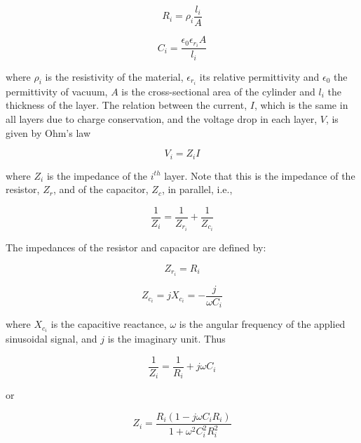 \begin{equation}
\label{eq2}
R_i = \rho_i \frac{l_i}{A}
\end{equation}

\begin{equation}
\label{eq3}
C_i = \frac{\epsilon_{0} \epsilon_{r_i} A}{l_i}
\end{equation}

\noindent where $\rho_i$ is the resistivity of the material, $\epsilon_{r_i}$ its relative permittivity and $\epsilon_{0}$ the permittivity of vacuum, $A$ is the cross-sectional area of the cylinder and $l_i$ the thickness of the layer. The relation between the current, $I$, which is the same in all layers due to charge conservation, and the voltage drop in each layer, $V$, is given by Ohm’s law

\begin{equation}
\label{eqOhms}
V_i = Z_i I
\end{equation}

\noindent where $Z_i$ is the impedance of the $i^{th}$ layer. Note that this is the impedance of the resistor, $Z_r$, and of the capacitor, $Z_c$, in parallel, i.e.,

\begin{equation}
\label{eqLayerimpedance}
\frac{1}{Z_{i}} = \frac{1}{Z_{r_i}} + \frac{1}{Z_{c_i}}
\end{equation}

The impedances of the resistor and capacitor are defined by:

\begin{equation}
\label{eqRimpedance}
Z_{r_i} = R_i
\end{equation}

\begin{equation}
\label{eqCimpedance}
Z_{c_i} = j X_{c_i} = -\frac{j}{\omega C_i}
\end{equation}

\noindent where $X_{c_i}$ is the capacitive reactance, $\omega$ is the angular frequency of the applied sinusoidal signal, and $j$ is the imaginary unit. Thus

\begin{equation}
\label{eqLayerimpedance2}
\frac{1}{Z_{i}} = \frac{1}{R_i} + j \omega C_i
\end{equation}

\noindent or

\begin{equation}
\label{eqLayerimpedance22}
Z_{i} = \frac{R_i (1 - j \omega C_i R_i)}{1 + \omega^{2} C_i^{2} R_i^{2}}
\end{equation}

